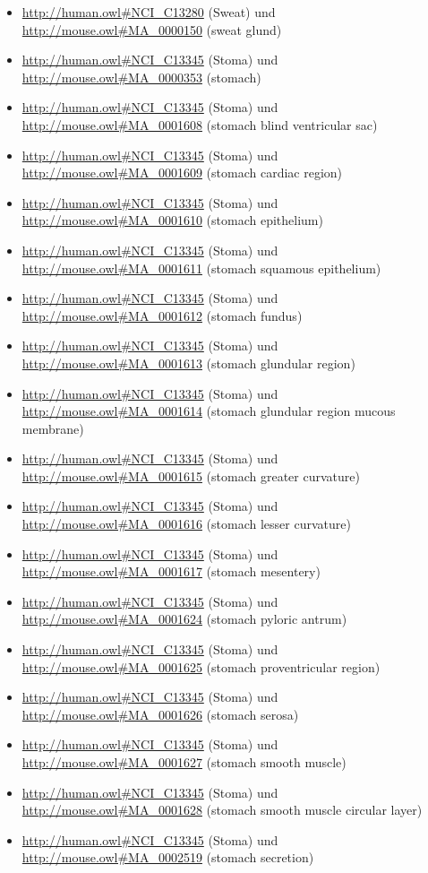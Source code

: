 \begin{itemize}
	\item \url{http://human.owl#NCI_C13280} (Sweat) und \url{http://mouse.owl#MA_0000150} (sweat glund)
	\item \url{http://human.owl#NCI_C13345} (Stoma) und \url{http://mouse.owl#MA_0000353} (stomach)
	\item \url{http://human.owl#NCI_C13345} (Stoma) und \url{http://mouse.owl#MA_0001608} (stomach blind ventricular sac)
	\item \url{http://human.owl#NCI_C13345} (Stoma) und \url{http://mouse.owl#MA_0001609} (stomach cardiac region)
	\item \url{http://human.owl#NCI_C13345} (Stoma) und \url{http://mouse.owl#MA_0001610} (stomach epithelium)
	\item \url{http://human.owl#NCI_C13345} (Stoma) und \url{http://mouse.owl#MA_0001611} (stomach squamous epithelium)
	\item \url{http://human.owl#NCI_C13345} (Stoma) und \url{http://mouse.owl#MA_0001612} (stomach fundus)
	\item \url{http://human.owl#NCI_C13345} (Stoma) und \url{http://mouse.owl#MA_0001613} (stomach glundular region)
	\item \url{http://human.owl#NCI_C13345} (Stoma) und \url{http://mouse.owl#MA_0001614} (stomach glundular region mucous membrane)
	\item \url{http://human.owl#NCI_C13345} (Stoma) und \url{http://mouse.owl#MA_0001615} (stomach greater curvature)
	\item \url{http://human.owl#NCI_C13345} (Stoma) und \url{http://mouse.owl#MA_0001616} (stomach lesser curvature)
	\item \url{http://human.owl#NCI_C13345} (Stoma) und \url{http://mouse.owl#MA_0001617} (stomach mesentery)
	\item \url{http://human.owl#NCI_C13345} (Stoma) und \url{http://mouse.owl#MA_0001624} (stomach pyloric antrum)
	\item \url{http://human.owl#NCI_C13345} (Stoma) und \url{http://mouse.owl#MA_0001625} (stomach proventricular region)
	\item \url{http://human.owl#NCI_C13345} (Stoma) und \url{http://mouse.owl#MA_0001626} (stomach serosa)
	\item \url{http://human.owl#NCI_C13345} (Stoma) und \url{http://mouse.owl#MA_0001627} (stomach smooth muscle)
	\item \url{http://human.owl#NCI_C13345} (Stoma) und \url{http://mouse.owl#MA_0001628} (stomach smooth muscle circular layer)
	\item \url{http://human.owl#NCI_C13345} (Stoma) und \url{http://mouse.owl#MA_0002519} (stomach secretion)

\end{itemize}
